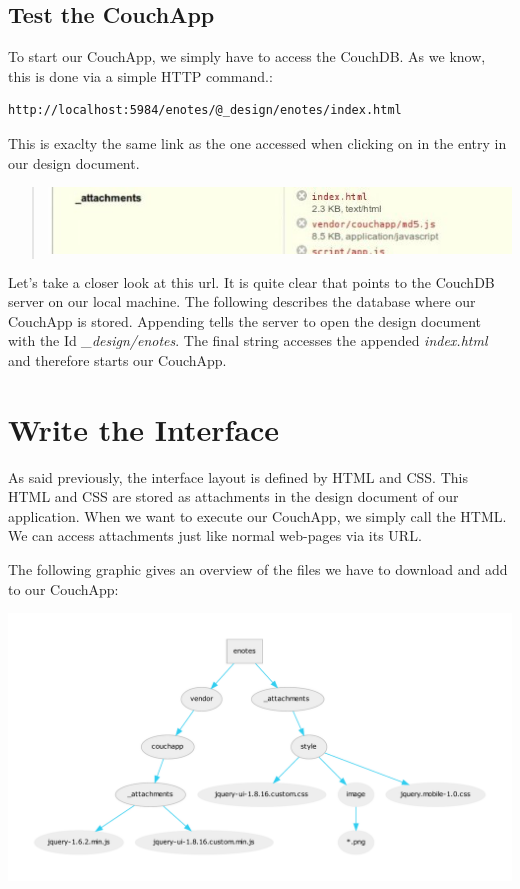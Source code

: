 \documentclass[letterpaper,10pt,english]{sphinxmanual}
\begin{document}
\section{Test the CouchApp}
\label{2-Start:test-the-couchapp}
To start our CouchApp, we simply have to access the CouchDB. As we know, this is done via a simple HTTP command.:

\begin{Verbatim}[commandchars=@\[\]]
http://localhost:5984/enotes/@_design/enotes/index.html
\end{Verbatim}

This is exaclty the same link as the one accessed when clicking on  in the  entry in our design document.
\begin{quote}

\includegraphics{2_index.jpg}
\end{quote}

Let's take a closer look at this url. It is quite clear that  points to the CouchDB server on our local machine. The following  describes the database where our CouchApp is stored. Appending  tells the server to open the design document with the Id \emph{\_design/enotes}. The final string  accesses the appended \emph{index.html} and therefore starts our CouchApp.


\chapter{Write the Interface}
\label{3-Interface:write-the-interface}\label{3-Interface::doc}
As said previously, the interface layout is defined by HTML and CSS. This HTML and CSS are stored as attachments in the design document of our application. When we want to execute our CouchApp, we simply call the HTML. We can access attachments just like normal web-pages via its URL.

The following graphic gives an overview of the files we have to download and add to our CouchApp:

\includegraphics{graphviz-760f5b9834e23e898b9076f23291eb684c5f2d81.pdf}
\end{document}
